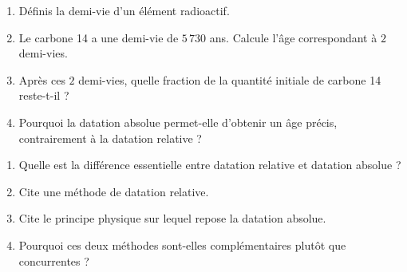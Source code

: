 \begin{enumerate}[label=\arabic*)]
\item Définis la demi-vie d'un élément radioactif.
\item Le carbone 14 a une demi-vie de $5\,730$ ans. Calcule l'âge correspondant à $2$
demi-vies.
\item Après ces $2$ demi-vies, quelle fraction de la quantité initiale de carbone 14
reste-t-il ?
\item Pourquoi la datation absolue permet-elle d'obtenir un âge précis, contrairement à
la datation relative ?
\end{enumerate}

\begin{enumerate}[label=\arabic*)]
\item Quelle est la différence essentielle entre datation relative et datation
absolue ?
\item Cite une méthode de datation relative.
\item Cite le principe physique sur lequel repose la datation absolue.
\item Pourquoi ces deux méthodes sont-elles complémentaires plutôt que concurrentes ?
\end{enumerate}

